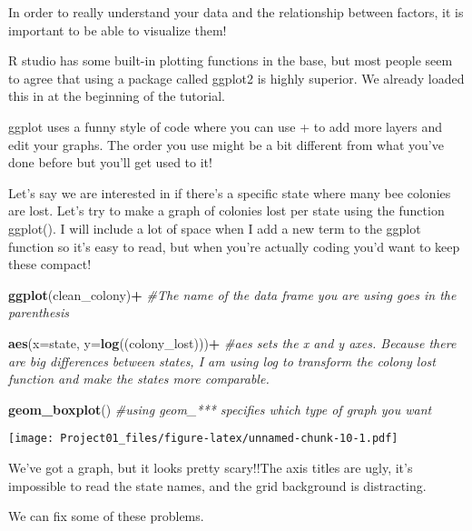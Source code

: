 \documentclass[
]{article}
\newenvironment{Shaded}{\begin{snugshade}}{\end{snugshade}}
\newcommand{\AttributeTok}[1]{\textcolor[rgb]{0.13,0.29,0.53}{#1}}
\newcommand{\CommentTok}[1]{\textcolor[rgb]{0.56,0.35,0.01}{\textit{#1}}}
\newcommand{\FunctionTok}[1]{\textcolor[rgb]{0.13,0.29,0.53}{\textbf{#1}}}
\newcommand{\NormalTok}[1]{#1}
\newcommand{\SpecialCharTok}[1]{\textcolor[rgb]{0.81,0.36,0.00}{\textbf{#1}}}
\begin{document}
In order to really understand your data and the relationship between
factors, it is important to be able to visualize them!

R studio has some built-in plotting functions in the base, but most
people seem to agree that using a package called ggplot2 is highly
superior. We already loaded this in at the beginning of the tutorial.

ggplot uses a funny style of code where you can use + to add more layers
and edit your graphs. The order you use might be a bit different from
what you've done before but you'll get used to it!

Let's say we are interested in if there's a specific state where many
bee colonies are lost. Let's try to make a graph of colonies lost per
state using the function ggplot(). I will include a lot of space when I
add a new term to the ggplot function so it's easy to read, but when
you're actually coding you'd want to keep these compact!

\begin{Shaded}
\begin{Highlighting}[]
\FunctionTok{ggplot}\NormalTok{(clean\_colony)}\SpecialCharTok{+}  \CommentTok{\#The name of the data frame you are using goes in the parenthesis}
  
  
  
  \FunctionTok{aes}\NormalTok{(}\AttributeTok{x=}\NormalTok{state, }\AttributeTok{y=}\FunctionTok{log}\NormalTok{((colony\_lost)))}\SpecialCharTok{+} \CommentTok{\#aes sets the x and y axes. Because there are big differences between states, I am using log to transform the colony lost function and make the states more comparable.}
  
  
  
  \FunctionTok{geom\_boxplot}\NormalTok{() }\CommentTok{\#using geom\_*** specifies which type of graph you want }
\end{Highlighting}
\end{Shaded}

\texttt{[image: Project01\_files/figure-latex/unnamed-chunk-10-1.pdf]}

We've got a graph, but it looks pretty scary!!The axis titles are ugly,
it's impossible to read the state names, and the grid background is
distracting.

We can fix some of these problems.
\end{document}
